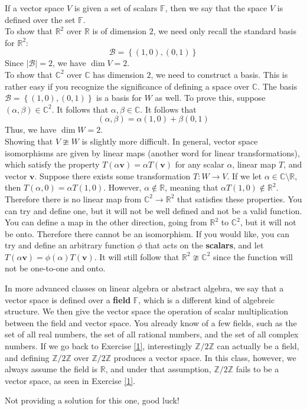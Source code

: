 \documentclass[12pt, letterpaper]{article}
\begin{document}
\begin{solution}
    If a vector space \(V\) is given a set of scalars \(\mathbb{F}\), then we say that the space \(V\) is defined over the set \(\mathbb{F}\).\\
    To show that \(\mathbb{R}^2\) over \(\mathbb{R}\) is of dimension \(2\), we need only recall the standard basis for \(\mathbb{R}^2:\)
    \[
        \mathcal{B} =\left\{ (1,0),(0,1) \right\}
    \]
    Since \(\left\vert \mathcal{B}  \right\vert=2 \), we have \(\dim V=2\).\\
    To show that \(\mathbb{C}^2\) over \(\mathbb{C}\) has dimension \(2\), we need to construct a basis. This is rather easy if you recognize the significance of defining a space over \(\mathbb{C}\). The basis \(\mathcal{B} =\left\{ (1,0),(0,1) \right\} \) is a basis for \(W\) as well. To prove this, suppose \((\alpha ,\beta )\in \mathbb{C}^2\). It follows that \(\alpha ,\beta \in \mathbb{C}\). It follows that
    \[
        (\alpha ,\beta )=\alpha (1,0)+\beta (0,1)
    \]
    Thus, we have \(\dim W=2\).\\
    Showing that \(V\ncong W\) is slightly more difficult. In general, vector space isomorphisms are given by linear maps (another word for linear transformations), which satisfy the property \(T(\alpha \mathbf{v})=\alpha T(\mathbf{v})\) for any scalar \(\alpha \), linear map \(T\), and vector \(\mathbf{v}\). Suppose there exists some transformation \(T:W\to V\). If we let \(\alpha \in \mathbb{C}\setminus\mathbb{R}\), then \(T(\alpha ,0)=\alpha T(1,0)\). However, \(\alpha \notin \mathbb{R}\), meaning that \(\alpha T(1,0)\notin \mathbb{R}^2\). Therefore there is no linear map from \(\mathbb{C}^2 \to \mathbb{R}^2\) that satisfies these properties. You can try and define one, but it will not be well defined and not be a valid function. You can define a map in the other direction, going from \(\mathbb{R}^2\) to \(\mathbb{C}^2\), but it will not be onto. Therefore there cannot be an isomorphism. If you would like, you can try and define an arbitrary function \(\phi\) that acts on the \textbf{scalars}, and let \(T(\alpha \mathbf{v})=\phi (\alpha )T(\mathbf{v})\). It will still follow that \(\mathbb{R}^2 \ncong \mathbb{C}^2\) since the function will not be one-to-one and onto.
\end{solution}
\begin{remark}
    In more advanced classes on linear algebra or abstract algebra, we say that a vector space is defined over a \textbf{field} \(\mathbb{F}\), which is a different kind of algebreic structure. We then give the vector space the operation of scalar multiplication between the field and vector space. You already know of a few fields, such as the set of all real numbers, the set of all rational numbers, and the set of all complex numbers. If we go back to Exercise \ref{1}, interestingly \(\mathbb{Z}/2\mathbb{Z}\) can actually be a field, and defining \(\mathbb{Z}/2\mathbb{Z}\) over \(\mathbb{Z}/2\mathbb{Z}\) produces a vector space. In this class, however, we always assume the field is \(\mathbb{R}\), and under that assumption, \(\mathbb{Z}/2\mathbb{Z}\) fails to be a vector space, as seen in Exercise \ref{1}.
\end{remark}
\begin{solution}
    Not providing a solution for this one, good luck!
\end{solution}
\end{document}
